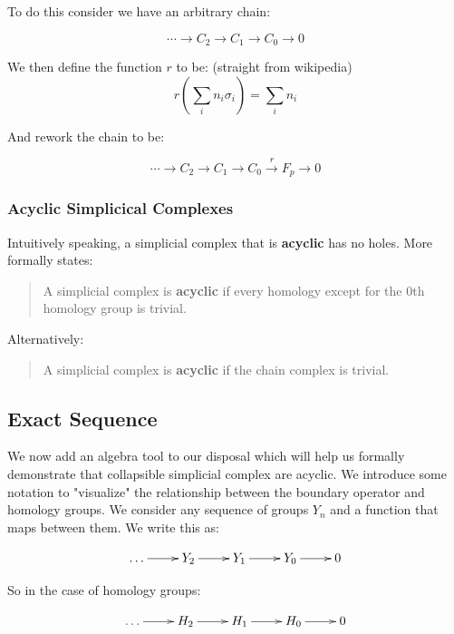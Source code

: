 \documentclass[letterpaper,12pt]{article}
\begin{document}
To do this consider we have an arbitrary chain:

$$\cdots \rightarrow C_2 \rightarrow C_1 \rightarrow C_0 \rightarrow 0$$

We then define the function $r$ to be: (straight from wikipedia)
$$r\left(\sum_i n_i \sigma_i\right) = \sum_i n_i$$

And rework the chain to be:

$$\cdots \rightarrow C_2 \rightarrow C_1 \rightarrow C_0 \xrightarrow{r} F_p \rightarrow 0$$

\subsubsection{Acyclic Simplicical Complexes}

Intuitively speaking, a simplicial complex that is \textbf{acyclic} has no holes. More formally states:

\begin{quote}
    A simplicial complex is \textbf{acyclic} if every homology except for the $0$th homology group is trivial.
\end{quote}

Alternatively:

\begin{quote}
    A simplicial complex is \textbf{acyclic} if the chain complex is trivial.
\end{quote}


\subsection{Exact Sequence}

We now add an algebra tool to our disposal which will help us formally demonstrate that collapsible simplicial complex are acyclic. We introduce some notation to "visualize" the relationship between the boundary operator and homology groups. We consider any sequence of groups $Y_n$ and a function that maps between them. We write this as:

\begin{displaymath}
    \xymatrix{\ldots \ar[r] & Y_2 \ar[r] & Y_1 \ar[r] & Y_0 \ar[r] & 0 }
\end{displaymath}

So in the case of homology groups:

\begin{displaymath}
    \xymatrix{\ldots \ar[r] & H_2 \ar[r] & H_1 \ar[r] & H_0 \ar[r] & 0 }
\end{displaymath}
\end{document}
